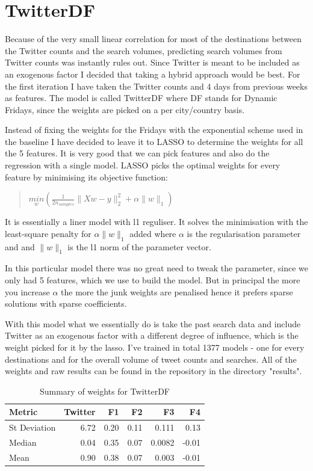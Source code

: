 \documentclass[minf,twoside,singlespacing,parskip,frontabs]{infthesis}
\begin{document}
\section{TwitterDF}
\label{sec:df}

Because of the very small linear correlation for most of the destinations between the Twitter counts and the search volumes, predicting search volumes from Twitter counts was instantly rules out. Since Twitter is meant to be included as an exogenous factor I decided that taking a hybrid approach would be best. For the first iteration I have taken the Twitter counts and 4 days from previous weeks as features. The model is called TwitterDF where DF stands for Dynamic Fridays, since the weights are picked on a per city/country basis. 

Instead of fixing the weights for the Fridays with the exponential scheme used in the baseline I have decided to leave it to LASSO to determine the weights for all the 5 features. It is very good that we can pick features and also do the regression with a single model. LASSO picks the optimal weights for every feature by minimising its objective function:
\begin{quotation}
$\underset{w}{min}({\frac{1}{2n_{samples}}} \|Xw - y \|_2^2 + \alpha\|w\|_1) $
\end{quotation}
It is essentially a liner model with l1 reguliser. It solves the minimisation with the least-square penalty for $\alpha\|w\|_1$ added where $\alpha$ is the regularisation parameter and and $\|w\|_1$ is the l1 norm of the parameter vector. 

In this particular model there was no great need to tweak the parameter, since we only had 5 features, which we use to build the model. But in principal the more you increase $\alpha$ the more the junk weights are penalised hence it prefers sparse solutions with sparse coefficients. 


With this model what we essentially do is take the past search data and include Twitter as an exogenous factor with a different degree of influence, which is the weight picked for it by the lasso. I've trained in total 1377 models - one for every destinations and for the overall volume of tweet counts and searches. All of the weights and raw results can be found in the repository in the directory "results".


\begin{table}[h]
\begin{center}
\begin{tabular}{ l | r | r | r | r | r}
\textbf{Metric} & \textbf{Twitter} & \textbf{F1} & \textbf{F2} & \textbf{F3} & \textbf{F4}\\
\hline
St Deviation & 6.72 & 0.20 & 0.11 & 0.111 & 0.13\\
Median & 0.04 & 0.35 & 0.07 & 0.0082 & -0.01\\
Mean & 0.90 & 0.38 & 0.07 & 0.003 & -0.01\\
\end{tabular}
\end{center}
\caption{Summary of weights for TwitterDF}
\end{table}
\end{document}
